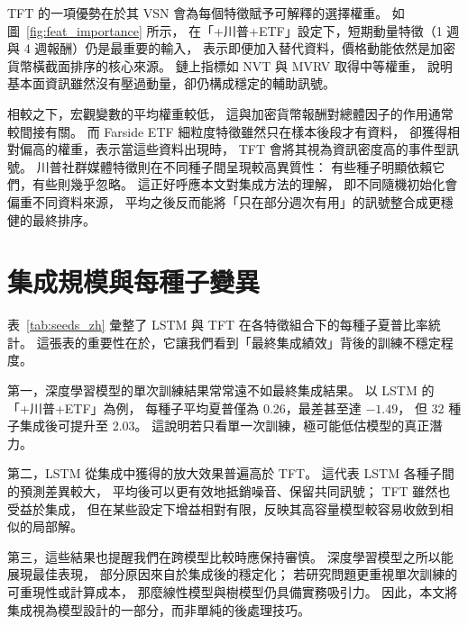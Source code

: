 TFT 的一項優勢在於其 VSN 會為每個特徵賦予可解釋的選擇權重。
如圖~\ref{fig:feat_importance} 所示，
在「+川普+ETF」設定下，短期動量特徵（1 週與 4 週報酬）仍是最重要的輸入，
表示即便加入替代資料，價格動能依然是加密貨幣橫截面排序的核心來源。
鏈上指標如 NVT 與 MVRV 取得中等權重，
說明基本面資訊雖然沒有壓過動量，卻仍構成穩定的輔助訊號。

相較之下，宏觀變數的平均權重較低，
這與加密貨幣報酬對總體因子的作用通常較間接有關。
而 Farside ETF 細粒度特徵雖然只在樣本後段才有資料，
卻獲得相對偏高的權重，表示當這些資料出現時，
TFT 會將其視為資訊密度高的事件型訊號。
川普社群媒體特徵則在不同種子間呈現較高異質性：
有些種子明顯依賴它們，有些則幾乎忽略。
這正好呼應本文對集成方法的理解，
即不同隨機初始化會偏重不同資料來源，
平均之後反而能將「只在部分週次有用」的訊號整合成更穩健的最終排序。

\section{集成規模與每種子變異}
\label{sec:analysis:ensemble}

表~\ref{tab:seeds_zh} 彙整了 LSTM 與 TFT 在各特徵組合下的每種子夏普比率統計。
這張表的重要性在於，它讓我們看到「最終集成績效」背後的訓練不穩定程度。

第一，深度學習模型的單次訓練結果常常遠不如最終集成結果。
以 LSTM 的「+川普+ETF」為例，
每種子平均夏普僅為 0.26，最差甚至達 $-1.49$，
但 32 種子集成後可提升至 2.03。
這說明若只看單一次訓練，極可能低估模型的真正潛力。

第二，LSTM 從集成中獲得的放大效果普遍高於 TFT。
這代表 LSTM 各種子間的預測差異較大，
平均後可以更有效地抵銷噪音、保留共同訊號；
TFT 雖然也受益於集成，
但在某些設定下增益相對有限，反映其高容量模型較容易收斂到相似的局部解。

第三，這些結果也提醒我們在跨模型比較時應保持審慎。
深度學習模型之所以能展現最佳表現，
部分原因來自於集成後的穩定化；
若研究問題更重視單次訓練的可重現性或計算成本，
那麼線性模型與樹模型仍具備實務吸引力。
因此，本文將集成視為模型設計的一部分，而非單純的後處理技巧。
